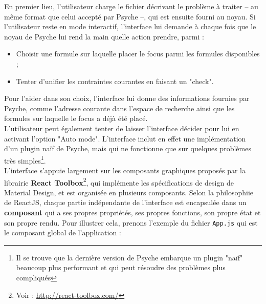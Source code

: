 En premier lieu, l'utilisateur charge le fichier décrivant le problème à traiter -- au même format que celui accepté par Psyche --, qui est ensuite fourni au noyau. Si l'utilisateur reste en mode interactif, l'interface lui demande à chaque fois que le noyau de Psyche lui rend la main quelle action prendre, parmi :

\begin{itemize}
\item Choisir une formule sur laquelle placer le focus parmi les formules disponibles ;
\item Tenter d'unifier les contraintes courantes en faisant un "check".
\end{itemize}

Pour l'aider dans son choix, l'interface lui donne des informations fournies par Psyche, comme l'adresse courante dans l'espace de recherche ainsi que les formules sur laquelle le focus a déjà été placé.\\

L'utilisateur peut également tenter de laisser l'interface décider pour lui en activant l'option "Auto mode". L'interface inclut en effet une implémentation d'un plugin naïf de Psyche, mais qui ne fonctionne que sur quelques problèmes très simples\footnote{Il se trouve que la dernière version de Psyche embarque un plugin "naïf" beaucoup plus performant et qui peut résoudre des problèmes plus compliqués}.\\

L'interface s'appuie largement sur les composants graphiques proposés par la librairie \textbf{React Toolbox}\footnote{Voir : \url{http://react-toolbox.com/}}, qui implémente les spécifications de design de Material Design, et est organisée en plusieurs composants. Selon la philosophiie de ReactJS, chaque partie indépendante de l'interface est encapsulée dans un \textbf{composant} qui a ses propres propriétés, ses propres fonctions, son propre état et son propre rendu. Pour illustrer cela, prenons l'exemple du fichier \texttt{App.js} qui est le composant global de l'application :

